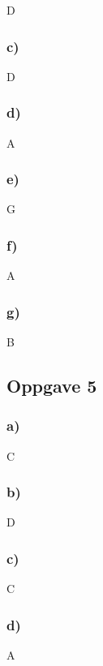 \documentclass{article}
\begin{document}
D

\subsubsection{c)}

D

\subsubsection{d)}

A

\subsubsection{e)}

G

\subsubsection{f)}

A

\subsubsection{g)}

B

\subsection{Oppgave 5}

\subsubsection{a)}

C

\subsubsection{b)}

D

\subsubsection{c)}

C

\subsubsection{d)}

A
\end{document}
